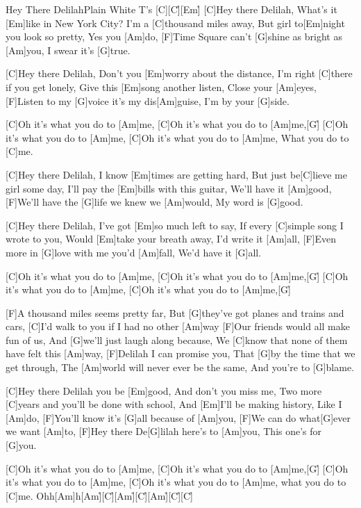 \documentclass[../main.tex]{subfiles}
\begin{document}
\begin{song}[2]{Hey There Delilah}{Plain White T's}{}
[C]{}\hh[Em]{\h}[C]{\h}[Em]{\h}
[C]Hey there Delilah, What’s it [Em]like in New York City?
I’m a [C]thousand miles away, But girl to[Em]night you look so pretty,
Yes you [Am]do, [F]Time Square can’t [G]shine as bright as [Am]you, I swear it’s [G]true.

[C]Hey there Delilah, Don’t you [Em]worry about the distance,
I’m right [C]there if you get lonely, Give this [Em]song another listen,
Close your [Am]eyes, [F]Listen to my [G]voice it’s my dis[Am]guise, I’m by your [G]side.

[C]Oh it’s what you do to [Am]me, [C]Oh it’s what you do to [Am]me,[G]{\h}
[C]Oh it’s what you do to [Am]me, [C]Oh it’s what you do to [Am]me, What you do to [C]me.

[C]Hey there Delilah, I know [Em]times are getting hard,
But just be[C]lieve me girl some day, I'll pay the [Em]bills with this guitar,
We'll have it [Am]good, [F]We'll have the [G]life we knew we [Am]would, My word is [G]good.

[C]Hey there Delilah, I’ve got [Em]so much left to say,
If every [C]simple song I wrote to you, Would [Em]take your breath away,
I’d write it [Am]all, [F]Even more in [G]love with me you’d [Am]fall, We’d have it [G]all.

[C]Oh it’s what you do to [Am]me, [C]Oh it’s what you do to [Am]me,[G]{\h}
[C]Oh it’s what you do to [Am]me, [C]Oh it’s what you do to [Am]me,[G]{\h}

[F]A thousand miles seems pretty far, But [G]they’ve got planes and trains and cars,
[C]I’d walk to you if I had no other [Am]way
[F]Our friends would all make fun of us, And [G]we'll just laugh along because,
We [C]know that none of them have felt this [Am]way,
[F]Delilah I can promise you, That [G]by the time that we get through,
The [Am]world will never ever be the same, And you’re to [G]blame.

[C]Hey there Delilah you be [Em]good, And don’t you miss me,
Two more [C]years and you’ll be done with school, And [Em]I'll be making history,
Like I [Am]do, [F]You’ll know it's [G]all because of [Am]you,
[F]We can do what[G]ever we want [Am]to,
[F]Hey there De[G]lilah here's to [Am]you, This one’s for [G]you.

[C]Oh it’s what you do to [Am]me, [C]Oh it’s what you do to [Am]me,[G]{\h}
[C]Oh it’s what you do to [Am]me, [C]Oh it’s what you do to [Am]me, what you do to [C]me.
Ohh[Am]h\hh[C]{\h}[Am]{\h}[C]{\h}[Am]{\h}[C]{\h}[Am]{\h}[C]{\h}[C]{\h}

\end{song}
\end{document}
